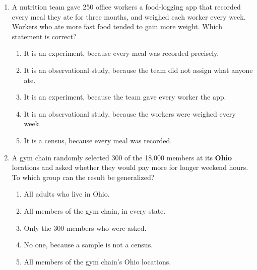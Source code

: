 \documentclass[12pt]{article}
\begin{document}
\begin{enumerate}[leftmargin=1.9em, itemsep=0.13in]

  \boxguard[11]
  \item A nutrition team gave 250 office workers a food-logging app that recorded every meal they
        ate for three months, and weighed each worker every week. Workers who ate more fast food
        tended to gain more weight. Which statement is correct?
        \begin{enumerate}[label=\textbf{(\Alph*)}, leftmargin=2.2em, itemsep=2pt]
          \item It is an experiment, because every meal was recorded precisely.
          \item It is an observational study, because the team did not assign what anyone ate.
          \item It is an experiment, because the team gave every worker the app.
          \item It is an observational study, because the workers were weighed every week.
          \item It is a census, because every meal was recorded.\hfill{}\rule[-0.2in]{0pt}{0.48in}
        \end{enumerate}

  \boxguard[11]
  \item A gym chain randomly selected 300 of the 18{,}000 members at its \textbf{Ohio} locations
        and asked whether they would pay more for longer weekend hours. To which group can the
        result be generalized?
        \begin{enumerate}[label=\textbf{(\Alph*)}, leftmargin=2.2em, itemsep=2pt]
          \item All adults who live in Ohio.
          \item All members of the gym chain, in every state.
          \item Only the 300 members who were asked.
          \item No one, because a sample is not a census.
          \item All members of the gym chain's Ohio locations.\hfill{}\rule[-0.2in]{0pt}{0.48in}
        \end{enumerate}


\end{enumerate}
\end{document}
